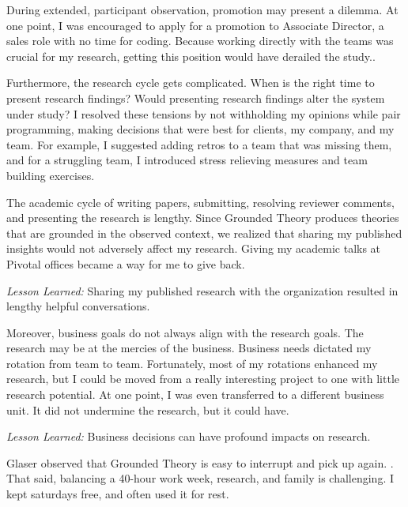 During extended, participant observation, promotion may present a dilemma. At one point, I was encouraged to apply for a promotion to Associate Director, a sales role with no time for coding. Because working directly with the teams was crucial for my research, getting this position would have derailed the study.. 

Furthermore, the research cycle gets complicated. When is the right time to present research findings? Would presenting research findings alter the system under study? I resolved these tensions by not withholding my opinions while pair programming, making decisions that were best for clients, my company, and my team. For example, I suggested adding retros to a team that was missing them, and for a struggling team, I introduced stress relieving measures and team building exercises.

The academic cycle of writing papers, submitting, resolving reviewer comments, and presenting the research is lengthy. Since Grounded Theory produces theories that are grounded in the observed context, we realized that sharing my published insights would not adversely affect my research. Giving my academic talks at Pivotal offices became a way for me to give back. 

\textit{Lesson Learned:} Sharing my published research with the organization resulted in lengthy helpful conversations. 

Moreover, business goals do not always align with the research goals. The research may be at the mercies of the business. Business needs dictated my rotation from team to team. Fortunately, most of my rotations enhanced my research, but I could be moved from a really interesting project to one with little research potential. At one point, I was even transferred to a different business unit. It did not undermine the research, but it could have. 

\textit{Lesson Learned:} Business decisions can have profound impacts on research. 

Glaser observed that Grounded Theory is easy to interrupt and pick up again.  \cite{GlaserIssues}. That said, balancing a 40-hour work week, research, and family is challenging. I kept saturdays free, and often used it for rest. 

